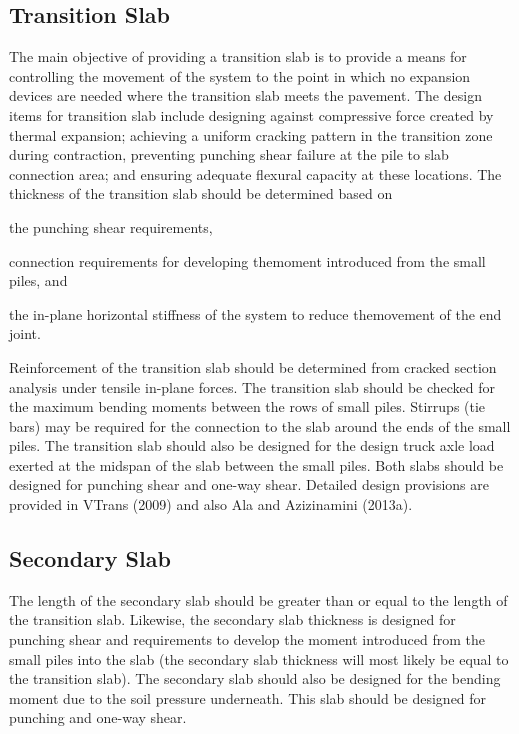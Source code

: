 \subsection{Transition Slab}
The main objective of providing a transition slab is to provide a means for controlling the movement of the system to the point in which no expansion devices are needed where the transition slab meets the pavement. The design items for transition slab include designing against compressive force created by thermal expansion; achieving a uniform cracking pattern in the transition zone during contraction, preventing punching shear failure at the pile to slab connection area; and ensuring adequate flexural capacity at these locations. The thickness of the transition slab should be determined based on 
\begin{enumerate*}
  \item the punching shear requirements, 
  \item connection requirements for developing themoment introduced from the small piles, and 
  \item the in-plane horizontal stiffness of the system to reduce themovement of the end joint. 
\end{enumerate*}
Reinforcement of the transition slab should be determined from cracked section analysis under tensile in-plane forces. The transition slab should be checked for the maximum bending moments between the rows of small piles. Stirrups (tie bars) may be required for the connection to the slab around the ends of the small piles. The transition slab should also be designed for the design truck axle load exerted at the midspan of the slab between the small piles. Both slabs should be designed for punching shear and one-way shear. Detailed design provisions are provided in VTrans (2009) and also Ala and Azizinamini (2013a).

\subsection{Secondary Slab}
The length of the secondary slab should be greater than or equal to the length of the transition slab. Likewise, the secondary slab thickness is designed for punching shear and requirements to develop the moment introduced from the small piles into the slab (the secondary slab thickness will most likely be equal to the transition slab). The secondary slab should also be designed for the bending moment due to the soil pressure underneath. This slab should be designed for punching and one-way shear.


